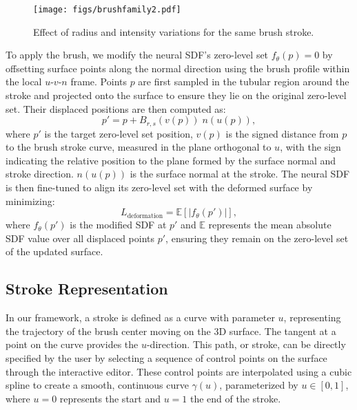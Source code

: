 \begin{figure}[htbp]
  \centering
    \texttt{[image: figs/brushfamily2.pdf]}
    \caption{Effect of radius and intensity variations for the same brush stroke.}
    \label{fig:brushfamily}
\end{figure}


To apply the brush, we modify the neural SDF’s zero-level set \( f_{\theta}(p) = 0 \) by offsetting surface points along the normal direction using the brush profile within the local \(u\)-\(v\)-\(n\) frame. Points \( p \) are first sampled in the tubular region around the stroke and projected onto the surface to ensure they lie on the original zero-level set. Their displaced positions are then computed as:  
\begin{equation}  
p' = p + B_{r, s}(v(p)) \; n(u(p)),  
\end{equation}  
where \( p' \) is the target zero-level set position, \( v(p) \) is the signed distance from \( p \) to the brush stroke curve, measured in the plane orthogonal to \( u \), with the sign indicating the relative position to the plane formed by the surface normal and stroke direction. \( n(u(p)) \) is the surface normal at the stroke. The neural SDF is then fine-tuned to align its zero-level set with the deformed surface by minimizing:  
\begin{equation}  
L_\text{deformation} = \mathbb{E}\left[ \left| f_{\theta}(p') \right| \right],  
\end{equation}  
where \(f_{\theta}(p')\) is the modified SDF at \(p'\) and \( \mathbb{E} \) represents the mean absolute SDF value over all displaced points \( p' \), ensuring they remain on the zero-level set of the updated surface.


\subsection{Stroke Representation}

In our framework, a stroke is defined as a curve with parameter $u$, representing the trajectory of the brush center moving on the 3D surface. The tangent at a point on the curve provides the $u$-direction. This path, or stroke, can be directly specified by the user by selecting a sequence of control points on the surface through the interactive editor. These control points are interpolated using a cubic spline to create a smooth, continuous curve $\gamma(u)$, parameterized by $u \in [0,1]$, where $u=0$ represents the start and $u=1$ the end of the stroke.

